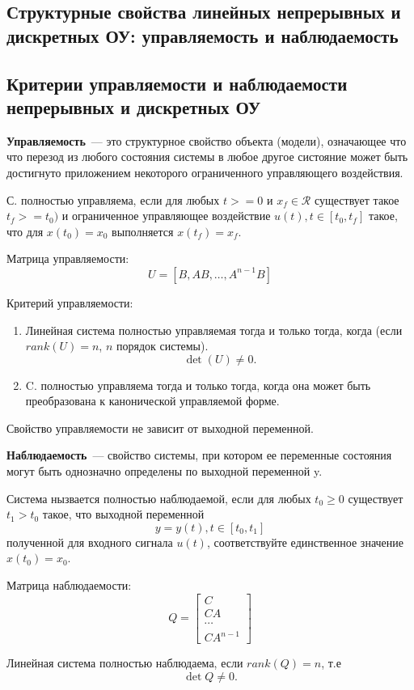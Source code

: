\subsection{Структурные свойства линейных непрерывных и дискретных ОУ: управляемость и 	наблюдаемость}
\subsection{Критерии управляемости и наблюдаемости непрерывных 	и дискретных ОУ}


\textbf{Управляемость}~--- это структурное свойство объекта (модели), означающее что что перезод из любого состояния системы в любое другое систояние может быть достигнуто приложением некоторого  ограниченного управляющего воздействия.

С. полностью управляема, если для любых $t >= 0$ и $x_f \in \mathcal{R}$ существует такое $t_f >= t_0)$ и ограниченное управляющее воздействие $u(t), t \in [t_0, t_f]$ такое, что для $x(t_0) = x_0$ выполняется $x(t_f) = x_f$.

Матрица управляемости:
\begin{equation}
    U = [B, AB, \dots,A^{n-1} B]
\end{equation}

Критерий управляемости:
\begin{enumerate}
    \item Линейная система полностью управляемая тогда и только тогда, когда (если $rank(U) = n$, $n$ порядок системы).
    \begin{equation}
        \det(U) \ne 0.
    \end{equation}

    \item C. полностью управляема тогда и только тогда, когда она может быть преобразована к канонической управляемой форме.
\end{enumerate}
Свойство управляемости не зависит от выходной переменной.

\textbf{Наблюдаемость}~--- свойство системы, при котором ее переменные состояния могут быть однозначно определены по выходной переменной y.

Система нызвается полностью наблюдаемой, если для любых $t_0\ge 0$ существует $t_1 > t_0$ такое, что выходной переменной
\begin{equation}
    y = y(t), t \in [t_0, t_1]
\end{equation}
полученной для входного сигнала $u(t)$, соответствуйте единственное значение $x(t_0) = x_0$.

Матрица наблюдаемости:
\begin{equation}
    Q = 
    \begin{bmatrix}
        C\\
        CA\\
        \cdots\\
        C A^{n-1}
    \end{bmatrix}
\end{equation}

Линейная система полностью наблюдаема, если $rank (Q) = n$, т.е
\begin{equation}
    \det Q \ne 0.
\end{equation}